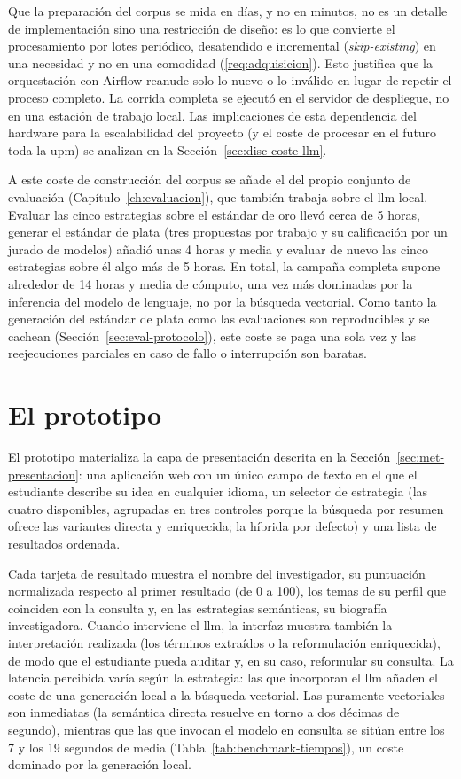 Que la preparación del corpus se mida en días, y no en minutos, no es un detalle de implementación sino una restricción de diseño: es lo que convierte el procesamiento por lotes periódico, desatendido e incremental (\emph{skip-existing}) en una necesidad y no en una comodidad (\ref{req:adquisicion}).
Esto justifica que la orquestación con Airflow reanude solo lo nuevo o lo inválido en lugar de repetir el proceso completo.
La corrida completa se ejecutó en el servidor de despliegue, no en una estación de trabajo local.
Las implicaciones de esta dependencia del hardware para la escalabilidad del proyecto (y el coste de procesar en el futuro toda la \gls{upm}) se analizan en la Sección~\ref{sec:disc-coste-llm}.

A este coste de construcción del corpus se añade el del propio conjunto de evaluación (Capítulo~\ref{ch:evaluacion}), que también trabaja sobre el \gls{llm} local.
Evaluar las cinco estrategias sobre el estándar de oro llevó cerca de 5 horas, generar el estándar de plata (tres propuestas por trabajo y su calificación por un jurado de modelos) añadió unas 4 horas y media y evaluar de nuevo las cinco estrategias sobre él algo más de 5 horas.
En total, la campaña completa supone alrededor de 14 horas y media de cómputo, una vez más dominadas por la inferencia del modelo de lenguaje, no por la búsqueda vectorial.
Como tanto la generación del estándar de plata como las evaluaciones son reproducibles y se cachean (Sección~\ref{sec:eval-protocolo}), este coste se paga una sola vez y las reejecuciones parciales en caso de fallo o interrupción son baratas.

\section{El prototipo \proyecto}
\label{sec:res-prototipo}

El prototipo materializa la capa de presentación descrita en la Sección~\ref{sec:met-presentacion}: una aplicación web con un único campo de texto en el que el estudiante describe su idea en cualquier idioma, un selector de estrategia (las cuatro disponibles, agrupadas en tres controles porque la búsqueda por resumen ofrece las variantes directa y enriquecida; la híbrida por defecto) y una lista de resultados ordenada.

Cada tarjeta de resultado muestra el nombre del investigador, su puntuación normalizada respecto al primer resultado (de 0 a 100), los temas de su perfil que coinciden con la consulta y, en las estrategias semánticas, su biografía investigadora.
Cuando interviene el \gls{llm}, la interfaz muestra también la interpretación realizada (los términos extraídos o la reformulación enriquecida), de modo que el estudiante pueda auditar y, en su caso, reformular su consulta.
La latencia percibida varía según la estrategia: las que incorporan el \gls{llm} añaden el coste de una generación local a la búsqueda vectorial.
Las puramente vectoriales son inmediatas (la semántica directa resuelve en torno a dos décimas de segundo), mientras que las que invocan el modelo en consulta se sitúan entre los 7 y los 19 segundos de media (Tabla~\ref{tab:benchmark-tiempos}), un coste dominado por la generación local.

